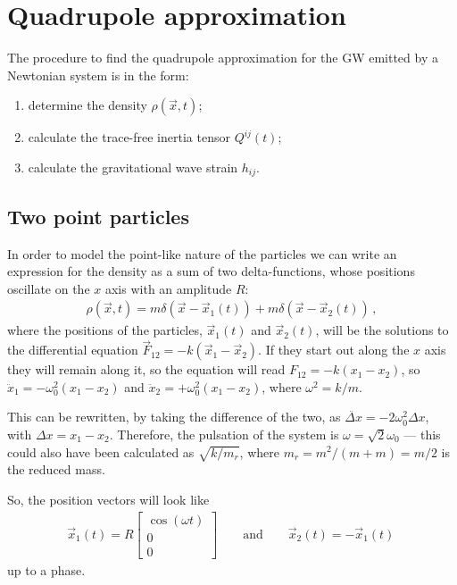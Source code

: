 \documentclass[main.tex]{subfiles}
\begin{document}
\section{Quadrupole approximation}

The procedure to find the quadrupole approximation 
for the GW emitted by a Newtonian system is in the form: 
\begin{enumerate}
    \item determine the density \(\rho (\vec{x}, t)\);
    \item calculate the trace-free inertia tensor \(Q^{ij}(t)\);
    \item calculate the gravitational wave strain \(h_{ij}\). 
\end{enumerate}

\subsection{Two point particles}

In order to model the point-like nature of the particles we can write an expression for the density as a sum of two delta-functions,
whose positions oscillate on the \(x\) axis with an amplitude \(R\):
%
\begin{align}
\rho (\vec{x}, t) = m\delta (\vec{x} - \vec{x}_1(t)) + m\delta (\vec{x} - \vec{x}_2 (t))                                                           \,,
\end{align}
%
where the positions of the particles, \(\vec{x}_1 (t)\) and \(\vec{x}_2 (t)\), will be the solutions to the differential equation \(\vec{F}_{12} = - k (\vec{x}_1 - \vec{x}_2)\). 
If they start out along the \(x\) axis they will remain along it, so the equation will read \(F_{12} = - k (x_1 - x_2 )\), so \(\ddot{x}_1 = - \omega_0 ^2 (x_1 - x_2 )\) and \(\ddot{x}_2 = + \omega_0 ^2 (x_1 - x_2 )\), where \(\omega^2 = k / m\). 

This can be rewritten, by taking the difference of the two, as \(\ddot{\Delta x} = - 2 \omega_0 ^2 \Delta x \), with \(\Delta x = x_1 - x_2 \). 
Therefore, the pulsation of the system is \(\omega = \sqrt{2} \omega_0  \) --- this could also have been calculated as \(\sqrt{k / m_r}\), where \(m_r = m^2/ (m+m) = m/ 2\) is the reduced mass.

So, the position vectors will look like
%
\begin{align}
\vec{x}_1 (t) = R \left[\begin{array}{c}
\cos(\omega t) \\ 
0 \\ 
0
\end{array}\right]
\qquad \text{and} \qquad
\vec{x}_2 (t) = - \vec{x}_1 (t)
\,
\end{align}
%
up to a phase. 
\end{document}
